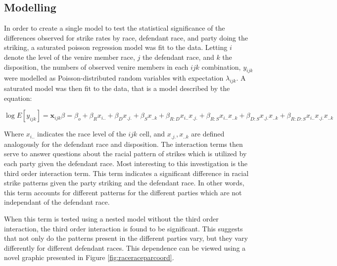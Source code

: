 \documentclass{article}
\begin{document}
\subsection{Modelling} \label{subse:mods}

In order to create a single model to test the statistical significance of the differences observed for strike rates by race,
defendant race, and party doing the striking, a saturated poisson regression model was fit to the data. Letting $i$ denote the
level of the venire member race, $j$ the defendant race, and $k$ the disposition, the numbers of observed venire members in each
$ijk$ combination, $y_{ijk}$ were modelled as Poisson-distributed random variables with expectation $\lambda_{ijk}$. A saturated
model was then fit to the data, that is a model described by the equation:

$$\log{E[y_{ijk}]} = \textbf{x}_{ijk}\beta = \beta_o + \beta_R x_{i..} + \beta_{D} x_{.j.} + \beta_S x_{..k} + \beta_{R:D}
x_{i..} x_{.j.} + \beta_{R:S} x_{i..} x_{..k} +\beta_{D:S} x_{.j.} x_{..k} + \beta_{R:D:S} x_{i..} x_{.j.} x_{..k}$$

Where $x_{i..}$ indicates the race level of the $ijk$ cell, and $x_{.j.},x_{..k}$ are defined analogously for the defendant race
and disposition. The interaction terms then serve to answer questions about the racial pattern of strikes which is utilized by
each party given the defendant race. Most interesting to this investigation is the third order interaction term. This term
indicates a significant difference in racial strike patterns given the party striking and the defendant race. In other words, this
term accounts for different patterns for the different parties which are not independant of the defendant race.

When this term is tested using a nested model without the third order interaction, the third order interaction is found to be
significant. This suggests that not only do the patterns present in the different parties vary, but they vary differently for
different defendant races. This dependence can be viewed using a novel graphic presented in Figure \ref{fig:raceraceparcoord}.
\end{document}
